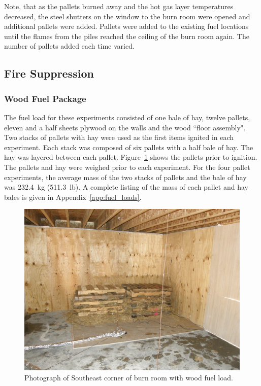 \documentclass[12pt,oneside]{book}
\begin{document}
Note, that as the pallets burned away and the hot gas layer temperatures decreased, the steel shutters on the window to the burn room were opened and additional pallets were added. Pallets were added to the existing fuel locations until the flames from the piles reached the ceiling of the burn room again. The number of pallets added each time varied.

\clearpage

\subsection{Fire Suppression}
\label{sec:Fuel_Load_Fire_Suppression}

\subsubsection{Wood Fuel Package}
\label{sec:fire_suppression_pallet_fuel}

The fuel load for these experiments consisted of one bale of hay, twelve pallets, eleven and a half sheets plywood on the walls and the wood ``floor assembly". Two stacks of pallets with hay were used as the first items ignited in each experiment. Each stack was composed of six pallets with a half bale of hay. The hay was layered between each pallet. Figure~\ref{fig:Wood_Fuel_Load} shows the pallets prior to ignition. The pallets and hay were weighed prior to each experiment. For the four pallet experiments, the average mass of the two stacks of pallets and the bale of hay was 232.4~kg (511.3~lb). A complete listing of the mass of each pallet and hay bales is given in Appendix~\ref{app:fuel_loads}.

\begin{figure}[!ht]
	\includegraphics[width=0.65\columnwidth]{../Figures/Pictures/Wood_Fuel_Package}
	\caption{Photograph of Southeast corner of burn room with wood fuel load.}
	\label{fig:Wood_Fuel_Load}
\end{figure}
\end{document}

